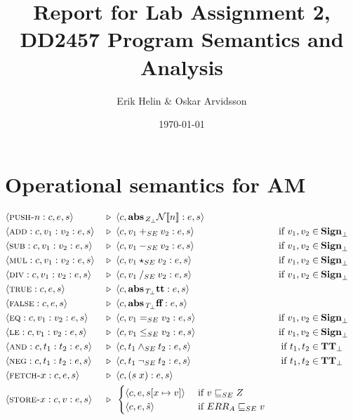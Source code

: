 \documentclass[11pt,oneside,a4paper]{article}
\newcommand{\SExp}[2]{\mathcal{#1}\llbracket #2 \rrbracket}
\newcommand{\AMIns}[1]{\textsc{#1}}
\newcommand{\AMConf}[3]{\langle #1, #2, #3 \rangle}
\newcommand{\AMArrow}{\: &\triangleright&\:\;}
\newcommand{\sign}{\textbf{Sign}_{\bot}}
\newcommand{\TT}{\textbf{TT}_{\bot}}
\newcommand{\abs}[2]{\textbf{abs}_{\,#1_{\bot}} #2 }
\begin{document}
\title{Report for Lab Assignment 2, DD2457 Program Semantics and Analysis}
\author{Erik Helin \& Oskar Arvidsson}
\date{\today}
\maketitle
\section*{Operational semantics for AM}
\begin{align*}
&\AMConf{\AMIns{push-}n:c}{e}{s} \AMArrow 
 \AMConf{c}{\abs{Z}{\SExp{N}{n}}:e}{s} \\
&\AMConf{\AMIns{add}:c}{v_1:v_2:e}{s} \AMArrow
 \AMConf{c}{v_1 +_{SE} v_2:e}{s}& \text{ if } v_1, v_2 \in \:& \sign \\
&\AMConf{\AMIns{sub}:c}{v_1:v_2:e}{s} \AMArrow
 \AMConf{c}{v_1 -_{SE} v_2:e}{s}& \text{ if } v_1, v_2 \in \:& \sign \\
&\AMConf{\AMIns{mul}:c}{v_1:v_2:e}{s} \AMArrow
 \AMConf{c}{v_1 \star_{SE} v_2:e}{s}& \text{ if } v_1, v_2 \in \:& \sign \\
&\AMConf{\AMIns{div}:c}{v_1:v_2:e}{s} \AMArrow
 \AMConf{c}{v_1 \: /_{SE}\: v_2:e}{s}& \text{ if } v_1, v_2 \in \:& \sign \\
&\AMConf{\AMIns{true}:c}{e}{s} \AMArrow
 \AMConf{c}{\abs{T}{\textbf{tt}}:e}{s}& \\
&\AMConf{\AMIns{false}:c}{e}{s} \AMArrow
 \AMConf{c}{\abs{T}{\textbf{ff}}:e}{s}& \\
&\AMConf{\AMIns{eq}:c}{v_1:v_2:e}{s} \AMArrow
 \AMConf{c}{v_1 =_{SE} v_2:e}{s}& \text{ if } v_1, v_2 \in \:& \sign \\
&\AMConf{\AMIns{le}:c}{v_1:v_2:e}{s} \AMArrow
 \AMConf{c}{v_1 \leq_{SE} v_2:e}{s}& \text{ if } v_1, v_2 \in \:& \sign \\
&\AMConf{\AMIns{and}:c}{t_1:t_2:e}{s} \AMArrow
 \AMConf{c}{t_1 \land_{SE} t_2:e}{s}& \text{ if } t_1, t_2 \in \:& \TT \\
&\AMConf{\AMIns{neg}:c}{t_1:t_2:e}{s} \AMArrow
 \AMConf{c}{t_1 \: \neg_{SE}\: t_2:e}{s}& \text{ if } t_1, t_2 \in \:& \TT \\
&\AMConf{\AMIns{fetch-}x:c}{e}{s} \AMArrow 
 \AMConf{c}{(s\;x):e}{s} \\
&\AMConf{\AMIns{store-}x:c}{v:e}{s} \AMArrow
 \begin{cases}
    \AMConf{c}{e}{s[x \mapsto v]} & \text{ if } v \sqsubseteq_{SE} Z \\
    \AMConf{c}{e}{\hat{s}} & \text{ if } ERR_A \sqsubseteq_{SE} v \\

\end{cases}
\end{align*}
\end{document}
